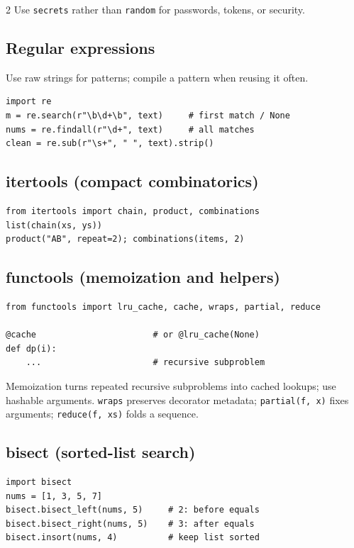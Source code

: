 \documentclass[10pt,a4paper]{article}
\newcommand{\py}[1]{\texttt{#1}}
\begin{document}
\begin{multicols}{2}
Use \py{secrets} rather than \py{random} for passwords, tokens, or security.

\subsection{Regular expressions}

Use raw strings for patterns; compile a pattern when reusing it often.

\begin{lstlisting}
import re
m = re.search(r"\b\d+\b", text)     # first match / None
nums = re.findall(r"\d+", text)     # all matches
clean = re.sub(r"\s+", " ", text).strip()
\end{lstlisting}

\subsection{itertools (compact combinatorics)}

\begin{lstlisting}
from itertools import chain, product, combinations
list(chain(xs, ys))
product("AB", repeat=2); combinations(items, 2)
\end{lstlisting}

\subsection{functools (memoization and helpers)}

\begin{lstlisting}
from functools import lru_cache, cache, wraps, partial, reduce

@cache                       # or @lru_cache(None)
def dp(i):
    ...                      # recursive subproblem
\end{lstlisting}

Memoization turns repeated recursive subproblems into cached lookups; use hashable arguments. \py{wraps} preserves decorator metadata; \py{partial(f, x)} fixes arguments; \py{reduce(f, xs)} folds a sequence.

\subsection{bisect (sorted-list search)}

\begin{lstlisting}
import bisect
nums = [1, 3, 5, 7]
bisect.bisect_left(nums, 5)     # 2: before equals
bisect.bisect_right(nums, 5)    # 3: after equals
bisect.insort(nums, 4)          # keep list sorted
\end{lstlisting}


\end{multicols}
\end{document}
